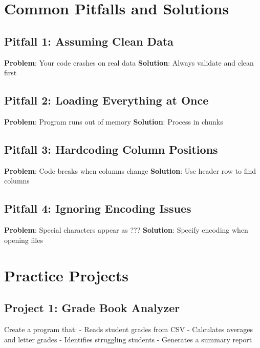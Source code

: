 \documentclass[
  letterpaper,
  DIV=11,
  numbers=noendperiod,
  oneside]{scrreprt}
\begin{document}
\section{Common Pitfalls and
Solutions}\label{common-pitfalls-and-solutions}

\subsection{Pitfall 1: Assuming Clean
Data}\label{pitfall-1-assuming-clean-data}

\textbf{Problem}: Your code crashes on real data \textbf{Solution}:
Always validate and clean first

\subsection{Pitfall 2: Loading Everything at
Once}\label{pitfall-2-loading-everything-at-once}

\textbf{Problem}: Program runs out of memory \textbf{Solution}: Process
in chunks

\subsection{Pitfall 3: Hardcoding Column
Positions}\label{pitfall-3-hardcoding-column-positions}

\textbf{Problem}: Code breaks when columns change \textbf{Solution}: Use
header row to find columns

\subsection{Pitfall 4: Ignoring Encoding
Issues}\label{pitfall-4-ignoring-encoding-issues}

\textbf{Problem}: Special characters appear as ??? \textbf{Solution}:
Specify encoding when opening files

\section{Practice Projects}\label{practice-projects}

\subsection{Project 1: Grade Book
Analyzer}\label{project-1-grade-book-analyzer}

Create a program that: - Reads student grades from CSV - Calculates
averages and letter grades - Identifies struggling students - Generates
a summary report
\end{document}
